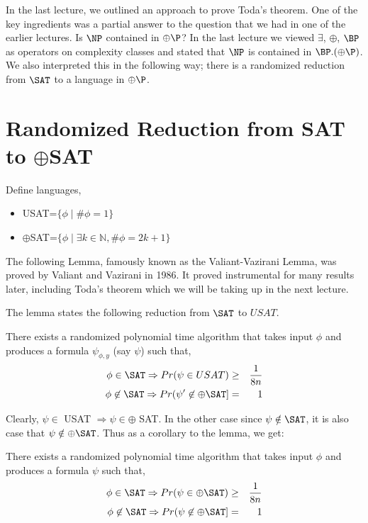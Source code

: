 \documentclass[11pt]{article}
\begin{document}


In the last lecture, we outlined an approach to prove Toda's theorem. One of the key ingredients was a partial answer to the question that we had in one of the earlier lectures. Is $\NP$ contained in $\oplus\P$? In the last lecture we viewed $\exists$, $\oplus$, $\BP$ as operators on complexity classes and stated that $\NP$ is contained in $\BP.(\oplus\P)$. 
We also interpreted this in the following way; there is a randomized reduction from $\SAT$ to a language in $\oplus\P$.

\section{Randomized Reduction from SAT to $\oplus$SAT}
Define languages, 
\begin{itemize}
\item[]USAT=$\{\phi \mid \#\phi=1\}$
\item[]$\oplus$SAT=$\{\phi \mid \exists k \in \mathbb{N}, \#\phi=2k+1\}$
\end{itemize}

The following Lemma, famously known as the Valiant-Vazirani Lemma, was proved by Valiant and Vazirani in 1986. It proved instrumental for many results later, including Toda's theorem which we will be taking up in the next lecture.

The lemma states the following reduction from $\SAT$ to $USAT$. 

\begin{lemma}
There exists a randomized polynomial time algorithm that takes input $\phi$ and produces a formula $\psi_{\phi,y}$ (say $\psi$) such that,
\begin{eqnarray*}
\phi \in \SAT \implies Pr(\psi \in USAT) & \geq & \frac{1}{8n} \\
\phi \not\in \SAT \implies Pr (\psi' \not\in \oplus\SAT] & = & 1
\end{eqnarray*}
\end{lemma}

Clearly, $\psi \in$ USAT $\Rightarrow \psi \in \oplus$ SAT. In the other case since $\psi \notin \SAT$, it is also case that $\psi \notin \oplus\SAT$. Thus as a corollary to the lemma, we get:

\begin{corollary}
There exists a randomized polynomial time algorithm that takes input $\phi$ and produces a formula $\psi$ such that,
\begin{eqnarray*}
\phi \in \SAT \implies Pr(\psi \in \oplus\SAT) & \geq &  \frac{1}{8n} \\
\phi \not\in \SAT \implies Pr (\psi \not\in \oplus\SAT] & = & 1
\end{eqnarray*}
\end{corollary}
\end{document}
